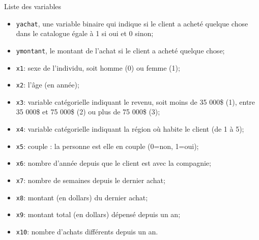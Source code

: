 \documentclass[
  ignorenonframetext,
]{beamer}
\providecommand{\tightlist}{%
  \setlength{\itemsep}{0pt}\setlength{\parskip}{0pt}}\usepackage{longtable,booktabs,array}
\begin{document}
\begin{frame}[fragile]{Liste des variables}
\protect\hypertarget{liste-des-variables}{}
\footnotesize

\begin{itemize}
\tightlist
\item
  \texttt{yachat}, une variable binaire qui indique si le client a
  acheté quelque chose dans le catalogue égale à 1 si oui et 0 sinon;
\item
  \texttt{ymontant}, le montant de l'achat si le client a acheté quelque
  chose;
\item
  \texttt{x1}: sexe de l'individu, soit homme (0) ou femme (1);
\item
  \texttt{x2}: l'âge (en année);
\item
  \texttt{x3}: variable catégorielle indiquant le revenu, soit moins de
  35 000\$ (1), entre 35 000\$ et 75 000\$ (2) ou plus de 75 000\$ (3);
\item
  \texttt{x4}: variable catégorielle indiquant la région où habite le
  client (de 1 à 5);
\item
  \texttt{x5}: couple : la personne est elle en couple (0=non, 1=oui);
\item
  \texttt{x6}: nombre d'année depuis que le client est avec la
  compagnie;
\item
  \texttt{x7}: nombre de semaines depuis le dernier achat;
\item
  \texttt{x8}: montant (en dollars) du dernier achat;
\item
  \texttt{x9}: montant total (en dollars) dépensé depuis un an;
\item
  \texttt{x10}: nombre d'achats différents depuis un an.
\end{itemize}

\normalsize
\end{frame}
\end{document}
